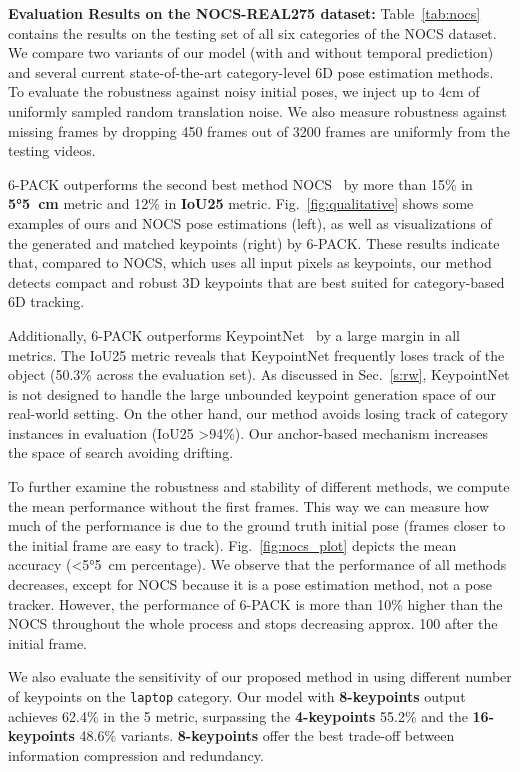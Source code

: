 \documentclass[letterpaper, 10 pt, conference]{ieeeconf}
\newcommand{\methodname}{\textsc{6-PACK}\xspace}
\begin{document}
\vspace{1mm}
\textbf{Evaluation Results on the NOCS-REAL275 dataset:}
Table~\ref{tab:nocs} contains the results on the testing set of all six categories of the NOCS dataset. We compare two variants of our model (with and without temporal prediction) and several current state-of-the-art category-level 6D pose estimation methods. To evaluate the robustness against noisy initial poses, we inject up to 4cm of uniformly sampled random translation noise. We also measure robustness against missing frames by dropping 450 frames out of 3200 frames are uniformly from the testing videos. 

\methodname{} outperforms the second best method NOCS~\cite{wang2019normalized} by more than 15\% in \textbf{\ang{5}\SI{5}{\centi\meter}} metric and 12\% in \textbf{IoU25} metric. Fig.~\ref{fig:qualitative} shows some examples of ours and NOCS pose estimations (left), as well as visualizations of the generated and matched keypoints (right) by \methodname{}. These results indicate that, compared to NOCS, which uses all input pixels as keypoints, our method detects compact and robust 3D keypoints that are best suited for category-based 6D tracking. 

Additionally, \methodname{} outperforms KeypointNet~\cite{suwajanakorn2018discovery} by a large margin in all metrics. The IoU25 metric reveals that KeypointNet frequently loses track of the object (50.3\% across the evaluation set). As discussed in Sec.~\ref{s:rw}, KeypointNet is not designed to handle the large unbounded keypoint generation space of our real-world setting. On the other hand, our method avoids losing track of category instances in evaluation (IoU25 \textgreater 94\%). Our anchor-based mechanism increases the space of search avoiding drifting.

To further examine the robustness and stability of different methods, we compute the mean performance without the first  frames. This way we can measure how much of the performance is due to the ground truth initial pose (frames closer to the initial frame are easy to track). Fig.~\ref{fig:nocs_plot} depicts the mean accuracy (\textless\ang{5}\SI{5}{\centi\meter} percentage). We observe that the performance of all methods decreases, except for NOCS because it is a pose estimation method, not a pose tracker. However, the performance of \methodname{} is more than 10\% higher than the NOCS throughout the whole process and stops decreasing approx. 100 after the initial frame.


We also evaluate the sensitivity of our proposed method in using different number of keypoints on the \texttt{laptop} category. Our model with \textbf{8-keypoints} output achieves 62.4\% in the 5\textdegree 5cm metric, surpassing the \textbf{4-keypoints} 55.2\% and the \textbf{16-keypoints} 48.6\% variants. \textbf{8-keypoints} offer the best trade-off between information compression and redundancy.
\end{document}
